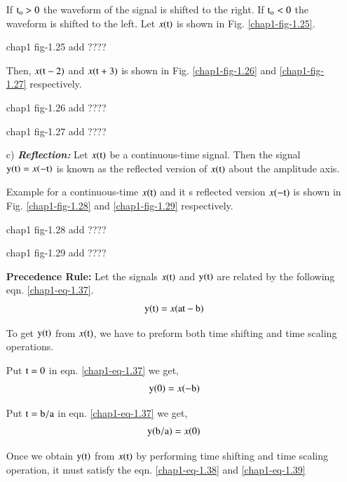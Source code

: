 \begin{itemize}
If $\textrm{t}_{\textrm{o}}>0$ the waveform of the signal is shifted to the right. If $\textrm{t}_{\textrm{o}}< 0$ the waveform is shifted to the left. Let $x(\textrm{t})$ is shown in Fig. \ref{chap1-fig-1.25}. 
\begin{center}
chap1  fig-1.25 add ????
\end{center}

Then, $x(\textrm{t}-2)$ and $x(\textrm{t}+3)$ is shown in Fig. \ref{chap1-fig-1.26} and \ref{chap1-fig-1.27} respectively.
\begin{center}
chap1  fig-1.26 add ????
\end{center}
\begin{center}
chap1  fig-1.27 add ????
\end{center}

\item[{\rm c)}] {\it \bfseries Reflection:} Let $x(\textrm{t})$ be a continuous-time signal. Then the signal
${\textrm{y}}{(\textrm{t})} = x{(-\textrm{t})}$ is known as the reflected version of $x(\textrm{t})$ about the amplitude axis.

Example for a continuous-time $x(\textrm{t})$ and it s reflected version $x(-\textrm{t})$ is shown in Fig. \ref{chap1-fig-1.28} and \ref{chap1-fig-1.29} respectively.
\begin{center}
chap1  fig-1.28 add ????
\end{center}
\begin{center}
chap1  fig-1.29 add ????
\end{center}

{\bfseries Precedence Rule:} Let the signals $x(\textrm{t})$ and $\textrm{y}(\textrm{t})$ are related by the following
eqn. \ref{chap1-eq-1.37}.
\begin{equation}
{\textrm{y}}{(\textrm{t})}=x {(\textrm{a}\textrm{t}-\textrm{b})}\label{chap1-eq-1.37}
\end{equation}

To get $\textrm{y}(\textrm{t})$ from $x \rm(\textrm{t})$, we have to preform both time shifting and time scaling operations.

Put $\textrm{t}=0$ in eqn. \ref{chap1-eq-1.37} we get,
\begin{equation}
{\textrm{y}}(0)=x {(-\textrm{b})}\label{chap1-eq-1.38}
\end{equation}

Put $\textrm{t}=\textrm{b}/\textrm{a}$ in eqn. \ref{chap1-eq-1.37} we get,
\begin{equation}
{\textrm{y}}{(\textrm{b}/\textrm{a})}=x(0)\label{chap1-eq-1.39}
\end{equation}

Once we obtain ${\textrm{y}}{(\textrm{t})}$ from $x{(\textrm{t})}$ by performing time shifting and time scaling operation, it must satisfy the eqn. \ref{chap1-eq-1.38} and \ref{chap1-eq-1.39}


\end{itemize}
